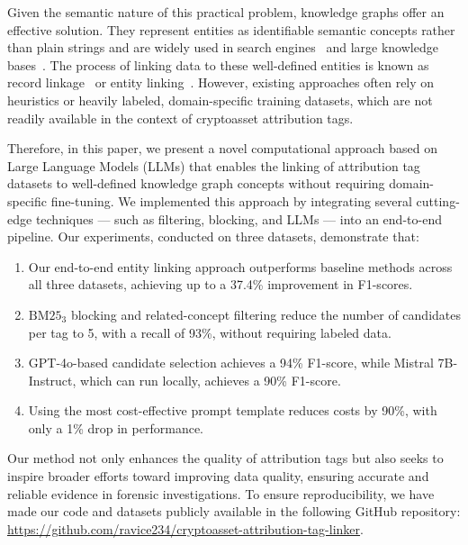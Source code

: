 Given the semantic nature of this practical problem, knowledge graphs offer an effective solution. They represent entities as identifiable semantic concepts rather than plain strings and are widely used in search engines~\cite{GoogleKG2012} and large knowledge bases~\cite{vrandevcic2014wikidata}. The process of linking data to these well-defined entities is known as record linkage~\cite{Elmagarmid2007} or entity linking~\cite{Shen2015}. However, existing approaches often rely on heuristics or heavily labeled, domain-specific training datasets, which are not readily available in the context of cryptoasset attribution tags.

Therefore, in this paper, we present a novel computational approach based on Large Language Models (LLMs) that enables the linking of attribution tag datasets to well-defined knowledge graph concepts without requiring domain-specific fine-tuning. We implemented this approach by integrating several cutting-edge techniques --- such as filtering, blocking, and LLMs --- into an end-to-end pipeline. Our experiments, conducted on three datasets, demonstrate that:

\begin{enumerate}

    \item Our end-to-end entity linking approach outperforms baseline methods across all three datasets, achieving up to a 37.4\% improvement in F1-scores.

    \item $\text{BM25}_3$ blocking and related-concept filtering reduce the number of candidates per tag to 5, with a recall of 93\%, without requiring labeled data.

    \item GPT-4o-based candidate selection achieves a 94\% F1-score, while Mistral 7B-Instruct, which can run locally, achieves a 90\% F1-score.

    \item Using the most cost-effective prompt template reduces costs by 90\%, with only a 1\% drop in performance.

\end{enumerate}

Our method not only enhances the quality of attribution tags but also seeks to inspire broader efforts toward improving data quality, ensuring accurate and reliable evidence in forensic investigations. To ensure reproducibility, we have made our code and datasets publicly available in the following GitHub repository: \url{https://github.com/ravice234/cryptoasset-attribution-tag-linker}.